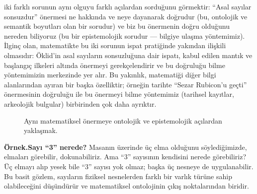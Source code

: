 iki farklı sorunun aynı olguyu farklı açılardan sorduğunu görmektir: “Asal sayılar sonsuzdur” önermesi ne hakkında ve neye dayanarak doğrudur (bu, ontolojik ve semantik boyutları olan bir sorudur) ve biz bu önermenin doğru olduğunu nereden biliyoruz (bu bir epistemolojik sorudur — bilgiye ulaşma yöntemimiz). İlginç olan, matematikte bu iki sorunun ispat pratiğinde yakından ilişkili olmasıdır: Öklid’in asal sayıların sonsuzluğuna dair ispatı, kabul edilen mantık ve başlangıç ilkeleri altında önermeyi gerekçelendirir ve bu doğruluğu bilme yöntemimizin merkezinde yer alır. Bu yakınlık, matematiği diğer bilgi alanlarından ayıran bir başka özelliktir; örneğin tarihte “Sezar Rubicon’u geçti” önermesinin doğruluğu ile bu önermeyi bilme yöntemimiz (tarihsel kayıtlar, arkeolojik bulgular) birbirinden çok daha ayrıktır.

\begin{figure}[htbp]
\centering
{}
\caption{Aynı matematiksel önermeye ontolojik ve epistemolojik açılardan yaklaşmak.}
\end{figure}

\begin{tcolorbox}[bookbox,colback=cEx]\textbf{\textsf{\textcolor{cAcc}{Örnek.}}}\quad \textbf{Sayı “3” nerede?} Masanın üzerinde üç elma olduğunu söylediğimizde, elmaları görebilir, dokunabiliriz. Ama “3” sayısının kendisini nerede görebiliriz? Üç elmayı alıp yesek bile “3” sayısı yok olmaz; başka üç nesneye de uygulanabilir. Bu basit gözlem, sayıların fiziksel nesnelerden farklı bir varlık türüne sahip olabileceğini düşündürür ve matematiksel ontolojinin çıkış noktalarından biridir.\end{tcolorbox}

